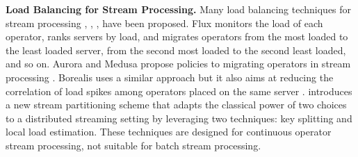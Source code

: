   \textbf{Load Balancing for Stream Processing.} Many load balancing techniques for stream processing \cite{Shah2003}, \cite{Cherniack2003}, \cite{Xing2005}, \cite{Anis2015} have been proposed. Flux \cite{Shah2003} monitors the load of each operator, ranks servers by load, and migrates operators from the most loaded to the least loaded server, from the second most loaded to the second least loaded, and so on. Aurora and Medusa propose policies to migrating operators in stream processing \cite{Cherniack2003}. Borealis uses a similar approach but it also aims at reducing the correlation of load spikes among operators placed on the same server \cite{Xing2005}. \cite{Anis2015} introduces a new stream partitioning scheme that adapts the classical power of two choices to a distributed streaming setting by leveraging two techniques: key splitting and local load estimation. These techniques are designed for continuous operator stream processing, not suitable for batch stream processing.